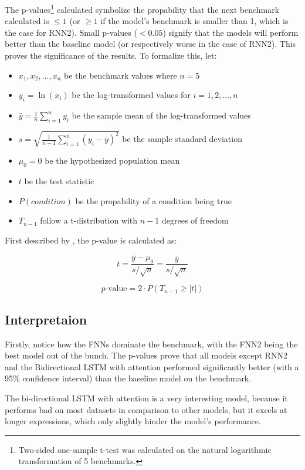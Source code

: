 \documentclass{article}
\begin{document}
The p-values\footnote{Two-sided one-sample t-test was calculated on the natural logarithmic transformation of 5 benchmarks.} calculated symbolize the propability that the next benchmark calculated is $\le 1$ (or $\ge 1$ if the model's benchmark is smaller than 1, which is the case for RNN2). 
Small p-values ($<0.05$) signify that the models will perform better than the baseline model (or respectively worse in the case of RNN2). This proves the significance of the results.
\newpage
To formalize this, let:
\begin{itemize}

    \item $x_1, x_2, ..., x_n$ be the benchmark values where $n = 5$
    \item $y_i = \ln(x_i)$ be the log-transformed values for $i = 1, 2, ..., n$
    \item $\bar{y} = \frac{1}{n}\sum_{i=1}^{n} y_i$ be the sample mean of the log-transformed values
    \item $s = \sqrt{\frac{1}{n-1}\sum_{i=1}^{n}(y_i - \bar{y})^2}$ be the sample standard deviation
    \item $\mu_0 = 0$ be the hypothesized population mean
    \item $t$ be the test statistic
    \item $P(condition)$ be the propability of a condition being true
    \item $T_{n-1}$ follow a t-distribution with $n-1$ degrees of freedom

\end{itemize}
First described by \cite{87464e34-37bc-3288-807c-e421e5a0d7a6}, the p-value is calculated as:

$$t = \frac{\bar{y} - \mu_0}{s/\sqrt{n}} = \frac{\bar{y}}{s/\sqrt{n}}$$

$$p\text{-value} = 2 \cdot P(T_{n-1} \geq |t|)$$

\subsection{Interpretaion}

Firstly, notice how the FNNs dominate the benchmark, with the FNN2 being the best model out of the bunch. 
The p-values prove that all models except RNN2 and the Bidirectional LSTM with attention performed significantly better (with a 95\% confidence interval) than the baseline model on the benchmark.

The bi-directional LSTM with attention is a very interesting model, because it performs bad on most datasets in comparison to other models, but it excels at longer expressions, which only slightly hinder the model's performance.
\end{document}
